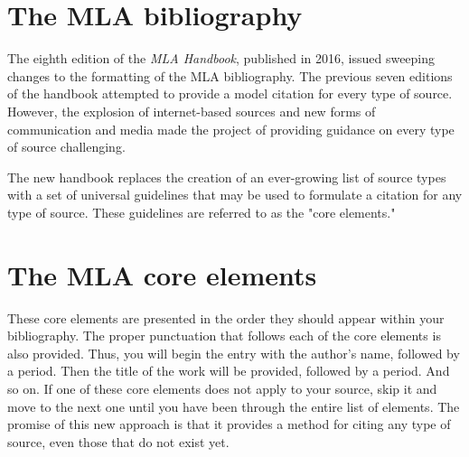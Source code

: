 \newpage

\section{The MLA bibliography}

The eighth edition of the \emph{MLA Handbook}, published in 2016, issued sweeping changes to the formatting of the MLA bibliography. The previous seven editions of the handbook attempted to provide a model citation for every type of source. However, the explosion of internet-based sources and new forms of communication and media made the project of providing guidance on every type of source challenging.  

The new handbook replaces the creation of an ever-growing list of source types with a set of universal guidelines that may be used to formulate a citation for any type of source. These guidelines are referred to as the "core elements."

\section{The MLA core elements}




These core elements are presented in the order they should appear within your bibliography. The proper punctuation that follows each of the core elements is also provided. Thus, you will begin the entry with the author's name, followed by a period. Then the title of the work will be provided, followed by a period. And so on. If one of these core elements does not apply to your source, skip it and move to the next one until you have been through the entire list of elements. The promise of this new approach is that it provides a method for citing any type of source, even those that do not exist yet.

